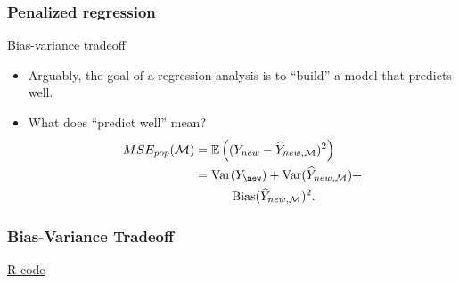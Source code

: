 \documentclass[handout]{beamer}
\newcommand{\V}{\text{Var}}
\newcommand{\Ee}{\mathbb{E}}
\newcommand{\model}{{\cal M}}
\begin{document}
   \begin{frame} \frametitle{Penalized regression}

   \begin{block}
   {Bias-variance tradeoff                     }
       \begin{itemize}

       \item Arguably, the goal of a regression analysis
   is to ``build'' a model that predicts well.

   \item What does ``predict well'' mean?
   $$
   \begin{aligned}
   MSE_{pop}(\model) &= \Ee \left((Y_{new} - \widehat{Y}_{new,{\cal M}})^2\right) \\
   &=
   \V(Y_{\new}) + \V(\widehat{Y}_{new,{\cal M}}) +
   \\
   & \qquad \quad \text{Bias}(\widehat{Y}_{new,{\cal M}})^2.
   \end{aligned}
   $$
       \end{itemize}
   \end{block}
   \end{frame}



   \begin{frame}
   \frametitle{Bias-Variance Tradeoff}
   \begin{center}
   \end{center}
   \href{http://www.stanford.edu/class/stats191/selection.html#bias-variance-tradeoff}{R code}
   \end{frame}

\end{document}

